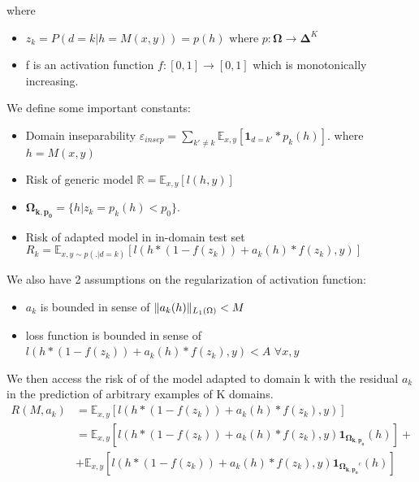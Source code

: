 \documentclass[12pt,a4paper,twoside]{report}
\theoremstyle{definition}
\begin{document}
where 
\begin{itemize}
	\item $z_k = P(d=k | h=M(x,y)) = p(h)$ where $p: \mathbf{\Omega} \rightarrow \mathbf{\Delta}^{K}$
	\item f is an activation function $f: [0,1] \rightarrow [0,1]$ which is monotonically increasing.
\end{itemize}
We define some important constants:
\begin{itemize}
	\item Domain inseparability $\mathbb{\varepsilon}_{insep} = \displaystyle{\mathop{\sum}_{k' \neq k} \mathbb{E}_{x,y}[\mathbf{1}_{d=k'}*p_k(h)]}$. where $h=M(x,y)$
	\item Risk of generic model $\mathbb{R} = \mathbb{E}_{x,y}[l(h,y)]$
	\item $\mathbf{\Omega_{k,p_{0}}} = \lbrace h | z_k = p_k(h)<p_0\rbrace$.
	\item Risk of adapted model in in-domain test set $R_k = \displaystyle{\mathbb{E}_{x,y \sim p(.|d=k)}[l(h * (1-f(z_k)) + a_k(h) * f(z_k), y)]}$
\end{itemize}
We also have 2 assumptions on the regularization of activation function:
\begin{itemize}
	\item $a_k$ is bounded in sense of $\normL{a_k(h)} < M$
	\item loss function is bounded in sense of $l(h * (1-f(z_k)) + a_k(h) * f(z_k),y) < A$ $\forall x,y$
\end{itemize}
We then access the risk of of the model adapted to domain k with the residual $a_k$ in the prediction of arbitrary examples of K domains.
\begin{equation}
\begin{split}
R(M,a_k) &= \mathbb{E}_{x,y}[l(h * (1-f(z_k)) + a_k(h) * f(z_k),y)] \\
		&= \mathbb{E}_{x,y}[l(h * (1-f(z_k)) + a_k(h) * f(z_k),y)\mathbf{1}_{\mathbf{\Omega_{k,p_{0}}}}(h)] + \\
		&+ \mathbb{E}_{x,y}[l(h * (1-f(z_k)) + a_k(h) * f(z_k),y) \mathbf{1}_{\mathbf{\Omega_{k,p_{0}}}^{c}}(h)]
\end{split}
\end{equation}
\end{document}

